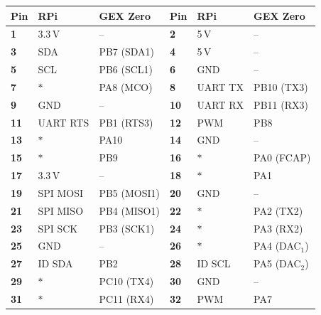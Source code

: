 \begin{table}
	\begin{tabularx}{\textwidth}{W{.1\textwidth}XX|W{.1\textwidth}XX}
		\toprule
		\textbf{Pin} & \textbf{RPi} & \textbf{GEX Zero} &
		\textbf{Pin} & \textbf{RPi} & \textbf{GEX Zero} \\
		
		\midrule
		\textbf{1} & \leavevmode\color{red}3.3\,V & -- &
		\textbf{2} & \leavevmode\color{red}5\,V & -- \\
		\textbf{3} & \IIC SDA & PB7 (SDA1) & 
		\textbf{4} & \leavevmode\color{red}5\,V & -- \\
		\textbf{5} & \IIC SCL & PB6 (SCL1) & 
		\textbf{6} & \leavevmode\color{blue}GND & -- \\
		\textbf{7} & $\ast$ & PA8 (MCO) & 
		\textbf{8} & UART TX & PB10 (TX3) \\
		
		\midrule
		\textbf{9} & \leavevmode\color{blue}GND & --
		& \textbf{10} & UART RX & PB11 (RX3) \\
		\textbf{11} & UART RTS & PB1 (RTS3)
		& \textbf{12} & PWM & PB8 \\
		\textbf{13} & $\ast$ & PA10 
		& \textbf{14} & \leavevmode\color{blue}GND & -- \\
		\textbf{15} & $\ast$ & PB9
		& \textbf{16} &  $\ast$ & PA0 (FCAP)\\
		
		\midrule
		\textbf{17} & \leavevmode\color{red}3.3\,V & --
		& \textbf{18} &  $\ast$ & PA1 \\
		\textbf{19} & SPI MOSI & PB5 (MOSI1)
		& \textbf{20} & \leavevmode\color{blue}GND & -- \\
		\textbf{21} & SPI MISO & PB4 (MISO1)
		& \textbf{22} &  $\ast$ & PA2 (TX2) \\
		\textbf{23} & SPI SCK & PB3 (SCK1)
		& \textbf{24} &  $\ast$ & PA3 (RX2) \\
		
		\midrule
		\textbf{25} & \leavevmode\color{blue}GND & --
		& \textbf{26} &  $\ast$ & PA4 (DAC$_1$) \\
		\textbf{27} & ID \IIC SDA & PB2 
		& \textbf{28} & ID \IIC SCL & PA5 (DAC$_2$) \\
		\textbf{29} & $\ast$ & PC10 (TX4)
		& \textbf{30} & \leavevmode\color{blue}GND & -- \\
		\textbf{31} & $\ast$ & PC11 (RX4)
		& \textbf{32} & PWM & PA7 \\
		

\end{tabularx}
\end{table}

